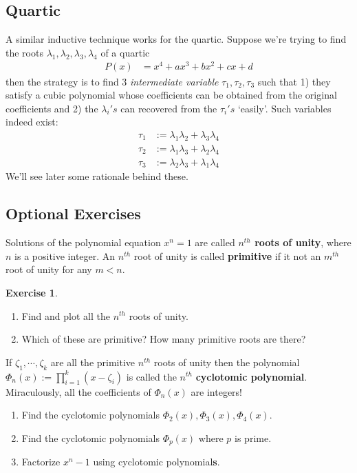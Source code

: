 \documentclass[reqno, 12pt, letter]{article}
\theoremstyle{plain}
\theoremstyle{definition}
\newtheorem{exercise}[theorem]{Exercise}
\theoremstyle{remark}
\numberwithin{equation}{section}
\begin{document}
	\subsection{Quartic}
		A similar inductive technique works for the quartic. Suppose we're trying to find the roots $ \lambda_1, \lambda_2, \lambda_3, \lambda_4$ of a quartic \begin{align*}
			P(x) &= x^4 + ax^3 + bx^2 + cx + d
		\end{align*}
		then the strategy is to find 3 \emph{intermediate variable} $ \tau_1, \tau_2, \tau_3$ such that 1) they satisfy a cubic polynomial whose coefficients can be obtained from the original coefficients and 2) the $\lambda_i's$ can recovered from the $ \tau_i's$ `easily'. Such variables indeed exist:
			\begin{align*}
				\tau_1 &:= \lambda_1 \lambda_2 + \lambda_3 \lambda_4 \\
				\tau_2 &:= \lambda_1 \lambda_3 + \lambda_2 \lambda_4 \\
				\tau_3 &:= \lambda_2 \lambda_3 + \lambda_1 \lambda_4 
			\end{align*}
		We'll see later some rationale behind these.
	
	
	\subsection{Optional Exercises}
	
		Solutions of the polynomial equation $ x^n = 1$ are called \textbf{$n^{th}$ roots of unity}, where $ n$ is a positive integer. An $ n^{th}$ root of unity is called \textbf{primitive} if it not an $ m^{th}$ root of unity for any $ m < n$.
	
	\begin{exercise} $ $
		\begin{enumerate}
			\item Find and plot all the $ n^{th}$ roots of unity. 
			\item Which of these are primitive? How many primitive roots are there?
		\end{enumerate}
		If $ \zeta_1, \cdots, \zeta_k$ are all the primitive $ n^{th}$ roots of unity then the polynomial $ \Phi_n(x) := \prod _{i=1}^k (x - \zeta_i)$ is called the $ n^{th}$ \textbf{cyclotomic polynomial}. Miraculously, all the coefficients of $ \Phi_n(x)$ are integers!
		\begin{enumerate}[resume]
			\item Find the cyclotomic polynomials $ \Phi_2(x), \Phi_3(x), \Phi_4(x)$.
			\item Find the cyclotomic polynomials $ \Phi_p(x)$ where $ p$ is prime.
			\item Factorize $ x^n - 1$ using cyclotomic polynomial\textbf{s}.
		\end{enumerate}
	\end{exercise}
	
\end{document}
